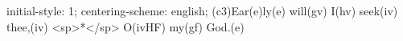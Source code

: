 initial-style: 1;
centering-scheme: english;
(c3)Ear(e)ly(e) will(gv) I(hv) seek(iv) thee,(iv) <sp>*</sp> O(ivHF) my(gf) God.(e)
